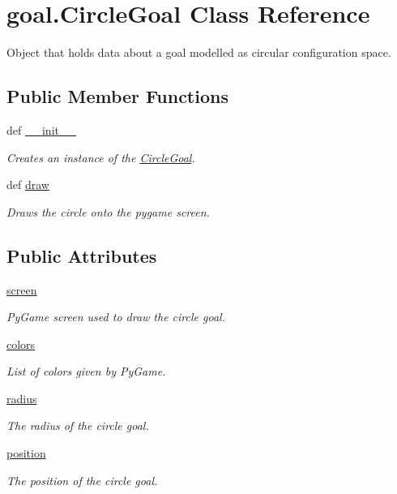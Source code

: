 \hypertarget{classgoal_1_1CircleGoal}{\section{goal.\-Circle\-Goal Class Reference}
\label{classgoal_1_1CircleGoal}
}


Object that holds data about a goal modelled as circular configuration space.  


\subsection*{Public Member Functions}
\begin{DoxyCompactItemize}
\item 
def \hyperlink{classgoal_1_1CircleGoal_a8fd58608bc720b2837cf72455a0e076b}{\-\_\-\-\_\-init\-\_\-\-\_\-}
\begin{DoxyCompactList}\small\item\em Creates an instance of the \hyperlink{classgoal_1_1CircleGoal}{Circle\-Goal}. \end{DoxyCompactList}\item 
def \hyperlink{classgoal_1_1CircleGoal_a91dfa039728e5b68a97fbfa59f4d03e6}{draw}
\begin{DoxyCompactList}\small\item\em Draws the circle onto the pygame screen. \end{DoxyCompactList}\end{DoxyCompactItemize}
\subsection*{Public Attributes}
\begin{DoxyCompactItemize}
\item 
\hyperlink{classgoal_1_1CircleGoal_a0868d7060d53cd1528aa699f65db3df3}{screen}
\begin{DoxyCompactList}\small\item\em Py\-Game screen used to draw the circle goal. \end{DoxyCompactList}\item 
\hyperlink{classgoal_1_1CircleGoal_a2fcb77d9e22165b8d9bcde9a411d7471}{colors}
\begin{DoxyCompactList}\small\item\em List of colors given by Py\-Game. \end{DoxyCompactList}\item 
\hyperlink{classgoal_1_1CircleGoal_ab0dbe63cd28b07d45ceedf1bce771b07}{radius}
\begin{DoxyCompactList}\small\item\em The radius of the circle goal. \end{DoxyCompactList}\item 
\hyperlink{classgoal_1_1CircleGoal_a5043cf3f8c23c20b038e44888e87622f}{position}
\begin{DoxyCompactList}\small\item\em The position of the circle goal. \end{DoxyCompactList}\end{DoxyCompactItemize}


